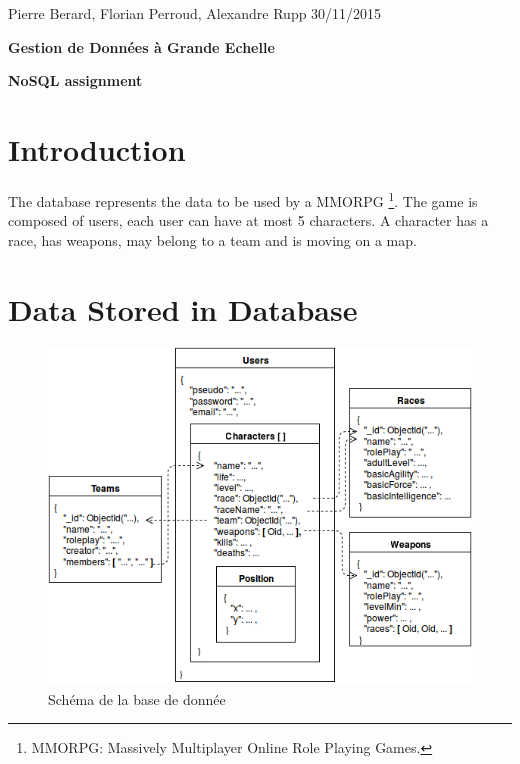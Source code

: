 \documentclass[a4paper, 11pt]{article}
\begin{document}
\noindent
Pierre Berard, Florian Perroud, Alexandre Rupp  \hfill 30/11/2015 
\vspace{-0.3cm}\\

{\LARGE 
\begin{center}
\textbf{Gestion de Données à Grande Echelle} \\
\vspace{0.2cm}
\end{center}
}
\begin{center}
\textbf{NoSQL assignment} \\
\end{center}



\section{Introduction}
The database represents the data to be used by a MMORPG \footnote{MMORPG: Massively Multiplayer Online Role Playing Games.}.
The game is composed of users, each user can have at most 5 characters. A character has a race, has weapons, may belong to a team and is moving on a map.

\section{Data Stored in Database}

\begin{figure}[!h]
  \centering
  \includegraphics[width=0.7\linewidth]{MMORPG_schema.png}
    \caption{Schéma de la base de donnée}
\end{figure}
\end{document}
